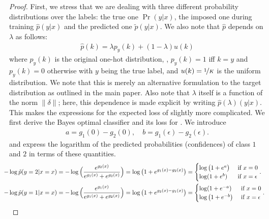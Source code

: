 \begin{proof}
    First, we stress that we are dealing with three different probability distributions over the labels:
	the true one $\Pr(y|x)$, the imposed one during training $\hat{p}(y|x)$ and the predicted one $\tilde{p}(y|x)$. We also note that $\hat{p}$ depends on $\lambda$ as follows:
    \begin{align}
        \hat{p}(k) = \lambda p_y(k) + (1 - \lambda) u(k)
    \end{align}
    where $p_y(k)$ is the original one-hot distribution, \ie, $p_y(k) = 1$ iff $k = y$ and $p_y(k) = 0$ otherwise with $y$ being the true label, and $u(k) = \nicefrac{1}{K}$ is the uniform distribution. We note that this is merely an alternative formulation to the target distribution as outlined in the main paper.
    Also note that $\lambda$ itself is a function of the norm $\|\delta\|$; here, this dependence is made explicit by writing $\hat{p}(\lambda)(y|x)$.
	This makes the expressions for the expected loss of \ConfTrain slightly more complicated. We first derive the Bayes optimal classifier and its loss for \ConfTrain.
    We introduce
    \begin{align}
        a = g_1(0)-g_2(0), \quad b=g_1(\epsilon)-g_2(\epsilon). \label{eq:supp-a-b}
    \end{align}
    and express the logarithm of the predicted probabilities (confidences) of class $1$ and $2$ in terms of these quantities.
	\begin{align*}
		\hspace*{-10px}
		-\log \tilde{p}(y=2|x=x)&= -\log\Big(\frac{e^{g_2(x)}}{e^{g_1(x)} + e^{g_2(x)}}\Big) = \log\big(1 + e^{g_1(x)-g_2(x)}\big)
     	=\begin{cases} \log\big(1+e^a\big) & \textrm{ if } x=0\\ \log(1+e^b) & \textrm{ if } x=\epsilon \end{cases}.\\
    	\hspace*{-10px}
    	-\log \tilde{p}(y=1|x=x)&=-\log\Big(\frac{e^{g_1(x)}}{e^{g_1(x)} + e^{g_2(x)}}\Big) = \log\big(1 + e^{g_2(x)-g_1(x)}\big) = 
    	\begin{cases} \log(1+e^{-a}) & \textrm{ if } x=0\\ \log\big(1+e^{-b}\big) & \textrm{ if } x=\epsilon\end{cases}.
    \end{align*}
    

\end{proof}
